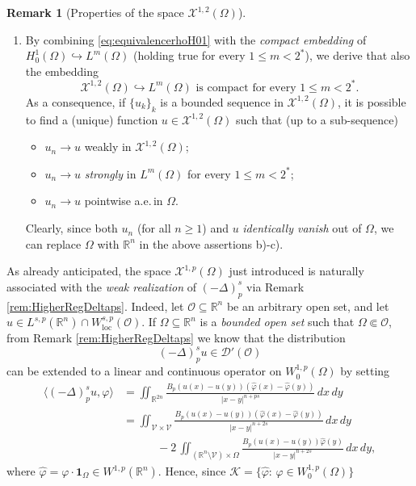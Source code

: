 \documentclass[11pt,a4paper]{amsart}
\def \R {\mathbb{R}}
\theoremstyle{definition}
\newtheorem{remark}[definition]{Remark}
\theoremstyle{plain}
\numberwithin{equation}{section}
\begin{document}
\begin{remark}[Properties of the space $\mathcal{X}^{1,2}(\Omega)$]
\begin{enumerate}
   \item[4)] By combining \eqref{eq:equivalencerhoH01} with the \emph{compact embedding} of 
   $H_0^1(\Omega)\hookrightarrow L^m(\Omega)$ (holding true for every $1\leq m < 2^\ast$),
   we derive that also the embedding
   $$\text{$\mathcal{X}^{1,2}(\Omega)\hookrightarrow L^{m}(\Omega)$ is compact
   for every $1\leq m< 2^\ast$}.$$
   As a consequence, if $\{u_k\}_k$ is a bounded sequence in $\mathcal{X}^{1,2}(\Omega)$, it is possible
   to find a (unique) function $u\in\mathcal{X}^{1,2}(\Omega)$ such that (up to a sub-sequence)
   \begin{itemize}
    \item[a)] $u_n\to u$ weakly in $\mathcal{X}^{1,2}(\Omega)$;
    \item[b)] $u_n\to u$ \emph{strongly} in $L^m(\Omega)$ for every $1\leq m < 2^\ast$;
    \item[c)] $u_n\to u$ pointwise a.e.\,in $\Omega$.
   \end{itemize}
   Clearly, since both $u_n$ (for all $n\geq 1$) and $u$ \emph{identically vanish}
    out of $\Omega$, we can replace
   $\Omega$ with $\R^n$ in the above assertions b)-c).
    \end{enumerate}
       \end{remark}
As already anticipated, the space $\mathcal{X}^{1,p}(\Omega)$ just introduced
is naturally associated with the \emph{weak realization} of $(-\Delta)^s_p$
via Remark \ref{rem:HigherRegDeltaps}. Indeed, let $\mathcal{O}\subseteq\mathbb{R}^n$ be an arbi\-trary open set, and let
$u\in L^{s,p}(\mathbb{R}^n)\cap W^{s,p}_{\mathrm{loc}}(\mathcal{O})$.
If $\Omega\subseteq\mathbb{R}^n$ is a \emph{bounded open set} such that
$\Omega\Subset\mathcal{O}$,  from Remark \ref{rem:HigherRegDeltaps}
we know that
the distribution $$(-\Delta)^s_p u\in \mathcal{D}'(\mathcal{O})$$ can be
extended to a linear and continuous operator on $W^{1,p}_0(\Omega)$ by setting
\begin{align*}
  \langle (-\Delta)^s_p u,\varphi\rangle& = \iint_{\R^{2n}}\frac{B_p(u(x)-u(y))
 (\hat\varphi(x)-\hat\varphi(y))}{|x-y|^{n+ps}}\,dx\,dy
 \\
 & = \iint_{\mathcal{V}\times\mathcal{V}}\frac{B_p(u(x)-u(y))
 (\hat\varphi(x)-\hat\varphi(y))}{|x-y|^{n+2s}}\,dx\,dy
 \\
 &\qquad\quad-2\,\iint_{(\R^n\setminus\mathcal{V})\times\Omega}
 \frac{B_p(u(x)-u(y))\hat\varphi(y)}{|x-y|^{n+2s}}\,dx\,dy,
 \end{align*}
where
 $\hat\varphi = \varphi\cdot\mathbf{1}_\Omega\in W^{1,p}(\R^n)$. Hence, since  $\mathcal{K} = \big\{\hat{\varphi}:\,\varphi\in W_0^{1,p}(\Omega)\big\}$
\end{document}
